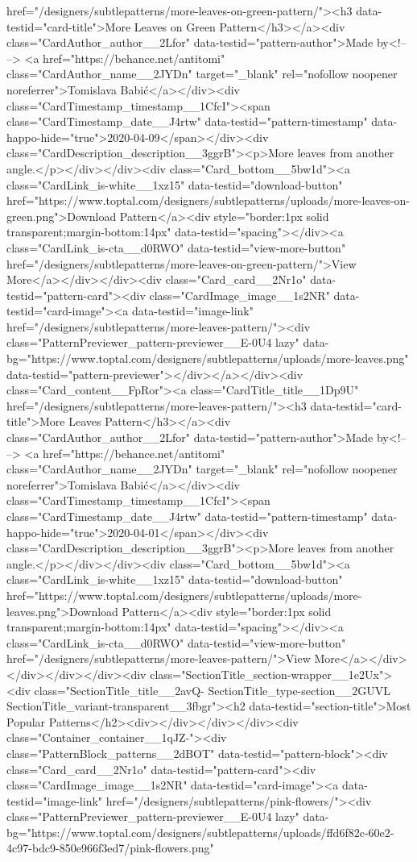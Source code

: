 href="/designers/subtlepatterns/more-leaves-on-green-pattern/"><h3 data-testid="card-title">More Leaves on Green Pattern</h3></a><div class="CardAuthor_author__2Lfor" data-testid="pattern-author">Made by<!-- --> <a href="https://behance.net/antitomi" class="CardAuthor_name__2JYDn" target="_blank" rel="nofollow noopener noreferrer">Tomislava Babić</a></div><div class="CardTimestamp_timestamp__1CfcI"><span class="CardTimestamp_date__J4rtw" data-testid="pattern-timestamp" data-happo-hide="true">2020-04-09</span></div><div class="CardDescription_description__3ggrB"><p>More leaves from another angle.</p></div></div><div class="Card_bottom__5bw1d"><a class="CardLink_is-white__1xz15" data-testid="download-button" href="https://www.toptal.com/designers/subtlepatterns/uploads/more-leaves-on-green.png">Download Pattern</a><div style="border:1px solid transparent;margin-bottom:14px" data-testid="spacing"></div><a class="CardLink_is-cta__d0RWO" data-testid="view-more-button" href="/designers/subtlepatterns/more-leaves-on-green-pattern/">View More</a></div></div><div class="Card_card__2Nr1o" data-testid="pattern-card"><div class="CardImage_image__1s2NR" data-testid="card-image"><a data-testid="image-link" href="/designers/subtlepatterns/more-leaves-pattern/"><div class="PatternPreviewer_pattern-previewer__E-0U4 lazy" data-bg="https://www.toptal.com/designers/subtlepatterns/uploads/more-leaves.png" data-testid="pattern-previewer"></div></a></div><div class="Card_content__FpRor"><a class="CardTitle_title__1Dp9U" href="/designers/subtlepatterns/more-leaves-pattern/"><h3 data-testid="card-title">More Leaves Pattern</h3></a><div class="CardAuthor_author__2Lfor" data-testid="pattern-author">Made by<!-- --> <a href="https://behance.net/antitomi" class="CardAuthor_name__2JYDn" target="_blank" rel="nofollow noopener noreferrer">Tomislava Babić</a></div><div class="CardTimestamp_timestamp__1CfcI"><span class="CardTimestamp_date__J4rtw" data-testid="pattern-timestamp" data-happo-hide="true">2020-04-01</span></div><div class="CardDescription_description__3ggrB"><p>More leaves from another angle.</p></div></div><div class="Card_bottom__5bw1d"><a class="CardLink_is-white__1xz15" data-testid="download-button" href="https://www.toptal.com/designers/subtlepatterns/uploads/more-leaves.png">Download Pattern</a><div style="border:1px solid transparent;margin-bottom:14px" data-testid="spacing"></div><a class="CardLink_is-cta__d0RWO" data-testid="view-more-button" href="/designers/subtlepatterns/more-leaves-pattern/">View More</a></div></div></div></div><div class="SectionTitle_section-wrapper__1e2Ux"><div class="SectionTitle_title__2avQ- SectionTitle_type-section__2GUVL SectionTitle_variant-transparent__3fbgr"><h2 data-testid="section-title">Most Popular Patterns</h2><div></div></div></div><div class="Container_container__1qJZ-"><div class="PatternBlock_patterns__2dBOT" data-testid="pattern-block"><div class="Card_card__2Nr1o" data-testid="pattern-card"><div class="CardImage_image__1s2NR" data-testid="card-image"><a data-testid="image-link" href="/designers/subtlepatterns/pink-flowers/"><div class="PatternPreviewer_pattern-previewer__E-0U4 lazy" data-bg="https://www.toptal.com/designers/subtlepatterns/uploads/ffd6f82c-60e2-4c97-bdc9-850e966f3ed7/pink-flowers.png" 